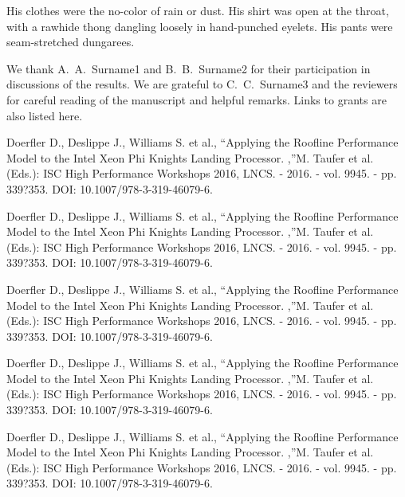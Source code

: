 \documentclass[
11pt,%
tightenlines,%
twoside,%
onecolumn,%
nofloats,%
nobibnotes,%
nofootinbib,%
superscriptaddress,%
noshowpacs,%
centertags]%
{revtex4}
\begin{document}
His clothes were the no-color of rain or dust. His shirt was open at the throat, with a rawhide thong dangling loosely in hand-punched eyelets. His pants were seam-stretched dungarees.

\begin{acknowledgments}
We thank A.~A.~Surname1 and B.~B.~Surname2 for their participation in discussions of the results. We are grateful to C.~C.~Surname3 and the reviewers for careful reading of the manuscript and helpful remarks. Links to grants are also listed here.
\end{acknowledgments}

\begin{thebibliography}{99}

Doerfler D., Deslippe J., Williams S. et al., \textquotedblleft Applying the Roofline Performance Model to the Intel Xeon Phi Knights Landing Processor. ,\textquotedblright M. Taufer et al. (Eds.): ISC High Performance Workshops 2016, LNCS. - 2016. - vol. 9945. - pp. 339?353. DOI: 10.1007/978-3-319-46079-6.

Doerfler D., Deslippe J., Williams S. et al., \textquotedblleft Applying the Roofline Performance Model to the Intel Xeon Phi Knights Landing Processor. ,\textquotedblright M. Taufer et al. (Eds.): ISC High Performance Workshops 2016, LNCS. - 2016. - vol. 9945. - pp. 339?353. DOI: 10.1007/978-3-319-46079-6.

Doerfler D., Deslippe J., Williams S. et al., \textquotedblleft Applying the Roofline Performance Model to the Intel Xeon Phi Knights Landing Processor. ,\textquotedblright M. Taufer et al. (Eds.): ISC High Performance Workshops 2016, LNCS. - 2016. - vol. 9945. - pp. 339?353. DOI: 10.1007/978-3-319-46079-6.

Doerfler D., Deslippe J., Williams S. et al., \textquotedblleft Applying the Roofline Performance Model to the Intel Xeon Phi Knights Landing Processor. ,\textquotedblright M. Taufer et al. (Eds.): ISC High Performance Workshops 2016, LNCS. - 2016. - vol. 9945. - pp. 339?353. DOI: 10.1007/978-3-319-46079-6.

Doerfler D., Deslippe J., Williams S. et al., \textquotedblleft Applying the Roofline Performance Model to the Intel Xeon Phi Knights Landing Processor. ,\textquotedblright M. Taufer et al. (Eds.): ISC High Performance Workshops 2016, LNCS. - 2016. - vol. 9945. - pp. 339?353. DOI: 10.1007/978-3-319-46079-6.


\end{thebibliography}
\end{document}
